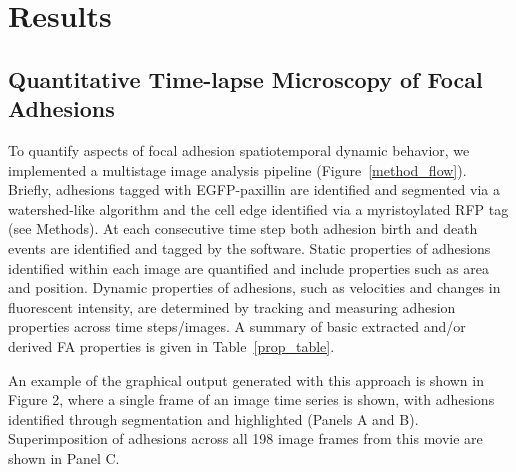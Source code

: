 \documentclass[10pt]{article}
\begin{document}
\section*{Results}


\subsection*{Quantitative Time-lapse Microscopy of Focal Adhesions}

To quantify aspects of focal adhesion spatiotemporal dynamic behavior, we
implemented a multistage image analysis pipeline (Figure~\ref{method_flow}).
Briefly, adhesions tagged with EGFP-paxillin are identified and segmented via a
watershed-like algorithm and the cell edge identified via a myristoylated  RFP
tag (see Methods).  At each consecutive time step both adhesion birth and death
events are identified and tagged by the software. Static properties of adhesions
identified within each image are quantified and include properties such as area
and position. Dynamic properties of adhesions, such as velocities and changes in
fluorescent intensity, are determined by tracking and measuring adhesion
properties across time steps/images. A summary of basic extracted and/or derived
FA properties is given in Table~\ref{prop_table}.

An example of the graphical output generated with this approach is shown in
Figure 2, where a single frame of an image time series is shown, with adhesions
identified through segmentation and highlighted (Panels A and B).
Superimposition of adhesions across all 198 image frames from this movie are
shown in Panel C.     
\end{document}
